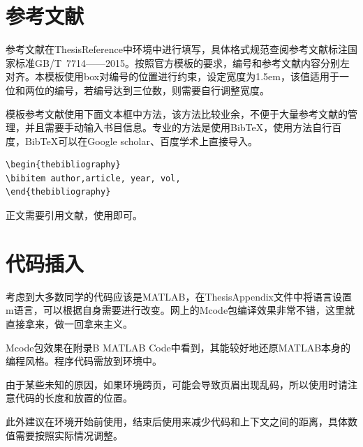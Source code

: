 {\begin{spacing}{1.5}
\section{参考文献}
参考文献在ThesisReference中环境中进行填写，具体格式规范查阅参考文献标注国家标准GB/T~7714——2015。按照官方模板的要求，编号和参考文献内容分别左对齐。本模板使用box对编号的位置进行约束，设定宽度为1.5em，该值适用于一位和两位的编号，若编号达到三位数，则需要自行调整宽度。

模板参考文献使用下面文本框中方法，该方法比较业余，不便于大量参考文献的管理，并且需要手动输入书目信息。专业的方法是使用BibTeX，使用方法自行百度，BibTeX可以在Google scholar、百度学术上直接导入。

\vspace{-4ex}
\begin{lstlisting}
\begin{thebibliography}
\bibitem author,article, year, vol,
\end{thebibliography}
\end{lstlisting}

正文需要引用文献，使用即可。

\section{代码插入}
考虑到大多数同学的代码应该是MATLAB，在ThesisAppendix文件中将语言设置m语言，可以根据自身需要进行改变。网上的Mcode包编译效果非常不错，这里就直接拿来，做一回拿来主义。

Mcode包效果在附录B MATLAB Code中看到，其能较好地还原MATLAB本身的编程风格。程序代码需放到环境中。

由于某些未知的原因，如果环境跨页，可能会导致页眉出现乱码，所以使用时请注意代码的长度和放置的位置。

此外建议在环境开始前使用，结束后使用来减少代码和上下文之间的距离，具体数值需要按照实际情况调整。

\end{spacing}
}